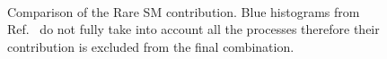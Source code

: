 \begin{figure}[htp]
\begin{center}
 \\
\caption{Comparison of the Rare SM contribution. Blue histograms from Ref.~\cite{AN2012:256} do not fully take into account 
all the processes therefore their contribution is excluded from the final combination.}
\label{fig:rare2}
\end{center}
\end{figure}

